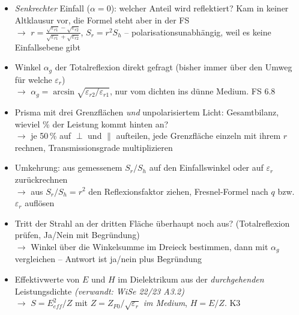 \documentclass[a4paper,10pt]{article}
\begin{document}
\begin{tcolorbox}[colback=A3Farbe!4, colframe=A3Farbe!55, boxrule=0.5pt, arc=1mm, left=3mm, right=2mm, top=2mm, bottom=2mm, breakable, title={\sffamily\bfseries\small Was diesmal neu drankommen könnte \normalfont\itshape\footnotesize -- eigene Prognose (keine offizielle Ankündigung): Umkehrungen, Kombinationen und Transfers zwischen den Aufgabentypen}, coltitle=white, colbacktitle=A3Farbe!70]
\sffamily\small
\begin{itemize}\setlength{\itemsep}{2.2mm}\setlength{\leftmargini}{4mm}
\item \emph{Senkrechter} Einfall ($\alpha=0$): welcher Anteil wird reflektiert? Kam in keiner Altklausur vor, die Formel steht aber in der FS\\[0.6mm] {\footnotesize\color{A3Farbe}$\rightarrow$ $r=\frac{\sqrt{\varepsilon_{r1}}-\sqrt{\varepsilon_{r2}}}{\sqrt{\varepsilon_{r1}}+\sqrt{\varepsilon_{r2}}}$, $S_r=r^2S_h$ -- polarisationsunabhängig, weil es keine Einfallsebene gibt}
\item Winkel $\alpha_g$ der Totalreflexion direkt gefragt (bisher immer über den Umweg \glqq für welche $\varepsilon_r$\grqq)\\[0.6mm] {\footnotesize\color{A3Farbe}$\rightarrow$ $\alpha_g=\arcsin\sqrt{\varepsilon_{r2}/\varepsilon_{r1}}$, nur vom dichten ins dünne Medium. FS 6.8}
\item Prisma mit drei Grenzflächen \emph{und} unpolarisiertem Licht: Gesamtbilanz, wieviel \% der Leistung kommt hinten an?\\[0.6mm] {\footnotesize\color{A3Farbe}$\rightarrow$ je 50\,\% auf $\perp$ und $\parallel$ aufteilen, jede Grenzfläche einzeln mit ihrem $r$ rechnen, Transmissionsgrade multiplizieren}
\item Umkehrung: aus gemessenem $S_r/S_h$ auf den Einfallswinkel oder auf $\varepsilon_r$ zurückrechnen\\[0.6mm] {\footnotesize\color{A3Farbe}$\rightarrow$ aus $S_r/S_h=r^2$ den Reflexionsfaktor ziehen, Fresnel-Formel nach $q$ bzw.\ $\varepsilon_r$ auflösen}
\item Tritt der Strahl an der dritten Fläche überhaupt noch aus? (Totalreflexion prüfen, Ja/Nein mit Begründung)\\[0.6mm] {\footnotesize\color{A3Farbe}$\rightarrow$ Winkel über die Winkelsumme im Dreieck bestimmen, dann mit $\alpha_g$ vergleichen -- Antwort ist ja/nein plus Begründung}
\item Effektivwerte von $E$ und $H$ im Dielektrikum aus der \emph{durchgehenden} Leistungsdichte \textcolor{Grau}{\itshape(verwandt: WiSe 22/23 A3.2)}\\[0.6mm] {\footnotesize\color{A3Farbe}$\rightarrow$ $S=E_{eff}^2/Z$ mit $Z=Z_{F0}/\sqrt{\varepsilon_r}$ \emph{im Medium}, $H=E/Z$. K3}
\end{itemize}\end{tcolorbox}
\end{document}
